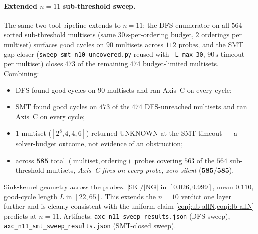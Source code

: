 \documentclass[11pt,a4paper]{article}
\theoremstyle{plain}
\theoremstyle{definition}
\newcommand{\SK}{\mathrm{SK}}
\begin{document}
\paragraph{Extended $n = 11$ sub-threshold sweep.}  The same
two-tool pipeline extends to $n = 11$: the DFS enumerator on all
$564$ sorted sub-threshold multisets (same $30\,\mathrm{s}$-per-ordering
budget, $2$ orderings per multiset) surfaces good cycles on $90$
multisets across $112$ probes, and the SMT gap-closer
(\texttt{sweep\_smt\_n10\_uncovered.py} reused with
\texttt{--L-max 30}, $90\,\mathrm{s}$ timeout per multiset) closes
$473$ of the remaining $474$ budget-limited multisets.  Combining:
\begin{itemize}[leftmargin=*]
\item DFS found good cycles on $90$ multisets and ran Axis~C on
every cycle;
\item SMT found good cycles on $473$ of the $474$ DFS-unreached
multisets and ran Axis~C on every cycle;
\item $1$ multiset ($[2^8, 4, 4, 6]$) returned UNKNOWN at the
SMT timeout — a solver-budget outcome, not evidence of an obstruction;
\item across $\mathbf{585}$ total
$(\mathrm{multiset}, \mathrm{ordering})$ probes covering $563$ of
the $564$ sub-threshold multisets,
\emph{Axis~C fires on every probe, zero silent}
($\mathbf{585 / 585}$).
\end{itemize}
Sink-kernel geometry across the probes: $|\SK|/|\mathrm{NG}|$ in
$[0.026, 0.999]$, mean $0.110$; good-cycle length $L$ in
$[22, 65]$.  This extends the $n = 10$ verdict one layer further
and is cleanly consistent with the uniform claim
\cref{conj:ub-allN,conj:lb-allN} predicts at $n = 11$.  Artifacts:
\texttt{axc\_n11\_sweep\_results.json} (DFS sweep),
\texttt{axc\_n11\_smt\_sweep\_results.json} (SMT-closed sweep).
\end{document}
